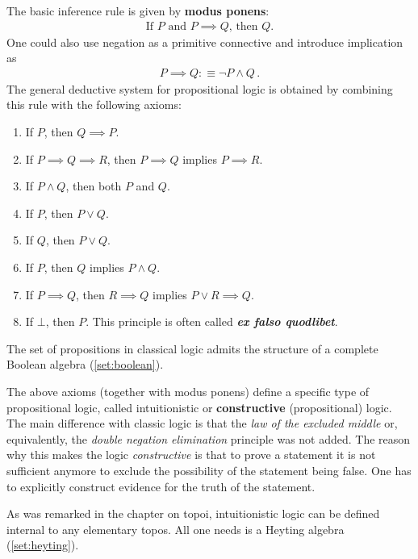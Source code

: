     The basic inference rule is given by \textbf{modus ponens}:
    \begin{gather}
        \text{If } P \text{ and } P\implies Q \text{, then } Q.
    \end{gather}
    One could also use negation as a primitive connective and introduce implication as
    \begin{gather}
        P\implies Q :\equiv \lnot P\land Q\,.
    \end{gather}
    The general deductive system for propositional logic is obtained by combining this rule with the following axioms:
    \begin{enumerate}
        \item If $P$, then $Q\implies P$.
        \item If $P\implies Q \implies R$, then $P\implies Q$ implies $P\implies R$.
        \item If $P\land Q$, then both $P$ and $Q$.
        \item If $P$, then $P\lor Q$.
        \item If $Q$, then $P\lor Q$.
        \item If $P$, then $Q$ implies $P\land Q$.
        \item If $P\implies Q$, then $R\implies Q$ implies $P\lor R\implies Q$.
        \item If $\bot$, then $P$. This principle is often called \textit{\textbf{ex falso quodlibet}}.
    \end{enumerate}

    \begin{property}\label{type:boolean_logic}
        The set of propositions in classical logic admits the structure of a complete Boolean algebra (\cref{set:boolean}).
    \end{property}

    \begin{remark}
        The above axioms (together with modus ponens) define a specific type of propositional logic, called intuitionistic or \textbf{constructive} (propositional) logic. The main difference with classic logic is that the \textit{law of the excluded middle} or, equivalently, the \textit{double negation elimination} principle was not added. The reason why this makes the logic \textit{constructive} is that to prove a statement it is not sufficient anymore to exclude the possibility of the statement being false. One has to explicitly construct evidence for the truth of the statement.

        As was remarked in the chapter on topoi, intuitionistic logic can be defined internal to any elementary topos. All one needs is a Heyting algebra (\cref{set:heyting}).
        
    \end{remark}

